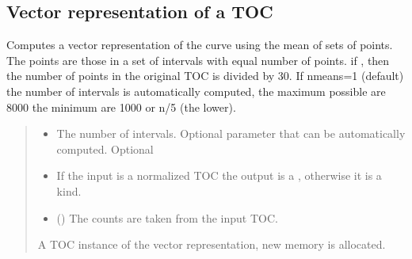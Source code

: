 \documentclass[letterpaper,10pt,english]{sphinxmanual}
\begin{document}
\subsection{Vector representation of a TOC}
\label{\detokenize{usage:vector-representation-of-a-toc}}

\begin{fulllineitems}
\label{\detokenize{usage:ootoc.TOC.vector}}
\pysigstartsignatures
{}
\pysigstopsignatures
\sphinxAtStartPar
Computes a vector representation of the curve using the mean of sets of points.
The points are those in a set of intervals with equal number of points. if , then the number of points in the
original TOC is divided by 30. If nmeans=\sphinxhyphen{}1 (default) the number of intervals is automatically computed, the maximum possible are 8000 the minimum are 1000 or n/5 (the lower).
\begin{quote}\begin{description}
\begin{itemize}
\item {} 
\sphinxAtStartPar
{} \textendash{} The number of intervals. Optional parameter that can be automatically computed. Optional

\item {} 
\sphinxAtStartPar
{} \textendash{} If the input is a normalized TOC the output is a , otherwise it is a  kind.

\item {} 
\sphinxAtStartPar
{}\sphinxstyleliteralstrong{\sphinxupquote{,}} (\sphinxstyleliteralemphasis{\sphinxupquote{, }}\sphinxstyleliteralemphasis{\sphinxupquote{,}}) \textendash{} The counts are taken from the input TOC.

\end{itemize}

\sphinxAtStartPar
A TOC instance of the vector representation, new memory is allocated.

\sphinxAtStartPar
{}

\end{description}\end{quote}

\end{fulllineitems}
\end{document}
